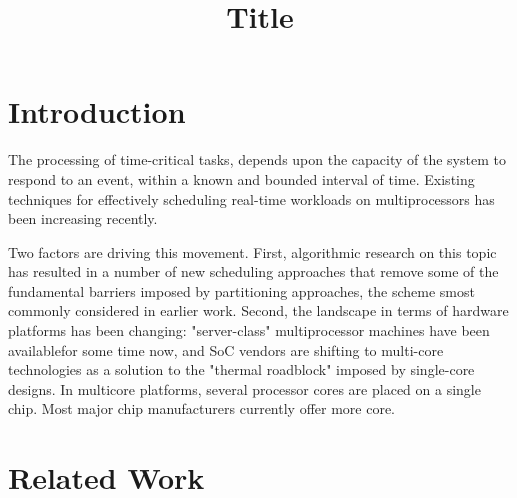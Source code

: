 \documentclass[conference]{IEEEtran}
\begin{document}
\title{Title}

\author{  \and {} }

\maketitle

\begin{abstract}
\end{abstract}

\section{Introduction}

The processing of time-critical tasks, depends upon the capacity of the system to respond to an event, within
a known and bounded interval of time. Existing techniques for effectively scheduling real-time workloads on
multiprocessors has been increasing recently.

Two factors are driving this movement. First, algorithmic research on this topic has resulted in a number of new
scheduling approaches that remove some of the fundamental barriers imposed by partitioning approaches, the scheme
smost commonly considered in earlier work. Second, the landscape in terms of hardware platforms has been changing:
"server-class" multiprocessor machines have been availablefor some time now, and SoC vendors are shifting to
multi-core technologies as a solution to the "thermal roadblock" imposed by single-core designs. In multicore
platforms, several processor cores are placed on a single chip. Most major chip manufacturers currently offer
more core.

\section{Related Work}
\end{document}
